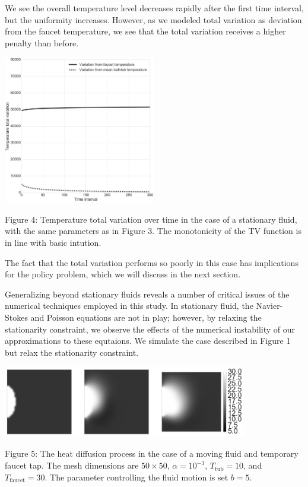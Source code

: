 \documentclass[12pt]{amsart}
\begin{document}
We see the overall temperature level decreases rapidly after the first time
interval, but the uniformity increases.  However, as we modeled total variation
as deviation from the faucet temperature, we see that the total variation
receives a higher penalty than before.

\begin{center}
    \includegraphics[width=0.5\textwidth]{../plots/tv-02.png}

    Figure 4: Temperature total variation over time in the case of a stationary
    fluid, with the same parameters as in Figure 3. The monotonicity of the TV
    function is in line with basic intution.
\end{center}
The fact that the total variation performs so poorly in this case has
implications for the policy problem, which we will discuss in the next section.

Generalizing beyond stationary fluids reveals a number of critical issues of the
numerical techniques employed in this study. In stationary fluid, the
Navier-Stokes and Poisson equations are not in play; however, by relaxing the
stationarity constraint, we observe the effects of the numerical instability of
our approximations to these equtaions. We simulate the case described in Figure
1 but relax the stationarity constraint.

\begin{center}
    \includegraphics[width=0.8\textwidth]{../plots/diffusion-03.png}

    Figure 5: The heat diffusion process in the case of a moving fluid and
    temporary faucet tap. The mesh dimensions are $50 \times 50$, $\alpha =
    10^{-3}$, $T_{\mathrm{tub}} = 10$, and $T_{\mathrm{faucet}} = 30$. The
    parameter controlling the fluid motion is set $b = 5$.
\end{center}
\end{document}
